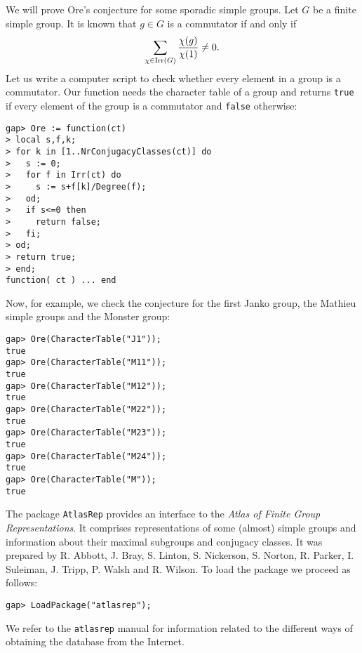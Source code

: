 \begin{example}
\label{exa:Ore}
We will prove Ore's conjecture for some
sporadic simple groups. Let $G$ be a finite simple group.
It is known that $g\in G$ is a commutator if and only if
\[
\sum_{\chi\in\operatorname{Irr}(G)}\frac{\chi(g)}{\chi(1)}\ne 0.
\]
Let us write
a computer script to check whether every element in a group
is a commutator. Our
function needs the character table of a group and returns
\lstinline{true} if every element of the group is a commutator and \lstinline{false} otherwise:
\begin{lstlisting}
gap> Ore := function(ct)
> local s,f,k;
> for k in [1..NrConjugacyClasses(ct)] do
>   s := 0;
>   for f in Irr(ct) do
>     s := s+f[k]/Degree(f);
>   od;
>   if s<=0 then
>     return false;
>   fi;
> od;
> return true;
> end;
function( ct ) ... end
\end{lstlisting}

Now, for example,   
we check the conjecture for the first Janko group, the 
Mathieu simple groups and 
the Monster group:
\begin{lstlisting}
gap> Ore(CharacterTable("J1"));
true
gap> Ore(CharacterTable("M11"));
true
gap> Ore(CharacterTable("M12"));
true
gap> Ore(CharacterTable("M22"));
true
gap> Ore(CharacterTable("M23"));
true
gap> Ore(CharacterTable("M24"));
true
gap> Ore(CharacterTable("M"));
true
\end{lstlisting}
\end{example}

The package \lstinline{AtlasRep} provides
an interface to the \emph{Atlas of Finite Group Representations}. 
It comprises representations 
of some (almost) simple groups and 
information about their maximal subgroups and conjugacy classes. 
It was prepared by 
R. Abbott, J. Bray, S. Linton, S. Nickerson, 
S. Norton, R. Parker, I. Suleiman, J. Tripp, P. Walsh and
R. Wilson.  To load the package we proceed as follows:
\begin{lstlisting}
gap> LoadPackage("atlasrep");
\end{lstlisting}
We refer to the \lstinline{atlasrep} manual 
for information related to the different ways of 
obtaining the database from the Internet. 

